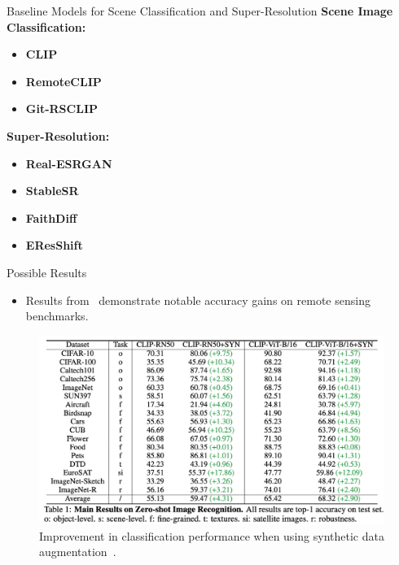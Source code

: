 \begin{refsection}
  \begin{frame}{Baseline Models for Scene Classification and Super-Resolution}
    \textbf{Scene Image Classification:}
    \begin{itemize}
      \item \textbf{CLIP}~\parencite{radfordLearningTransferableVisual2021}
      \item \textbf{RemoteCLIP}~\parencite{liuRemoteCLIPVisionLanguage2024}
      \item \textbf{Git-RSCLIP}~\parencite{text2earth2025}
    \end{itemize}
    \textbf{Super-Resolution:}
    \begin{itemize}
      \item \textbf{Real-ESRGAN}~\parencite{wangRealESRGANTrainingRealWorld2021b}
      \item \textbf{StableSR}~\parencite{wangExploitingDiffusionPrior2024}
      \item \textbf{FaithDiff}~\parencite{chenFaithDiffUnleashingDiffusion2024}
      \item \textbf{EResShift}~\parencite{yueEfficientDiffusionModel2025}
    \end{itemize}
    \bottomleftrefs
  \end{frame}
  \end{refsection}

\begin{refsection}
  \begin{frame}{Possible Results}
    \begin{itemize}
      \item Results from~\parencite{heSYNTHETICDATAGENERATIVE2022} demonstrate notable accuracy gains on remote sensing benchmarks.
    \end{itemize}
    \begin{figure}
      \centering
      \includegraphics[width=0.70\linewidth]{figs/syn_aug_results.png}
      \caption{\scriptsize Improvement in classification performance when using synthetic data augmentation~\parencite{heSYNTHETICDATAGENERATIVE2022}.}
    \end{figure}
    \bottomleftrefs
  \end{frame}
  \end{refsection}

